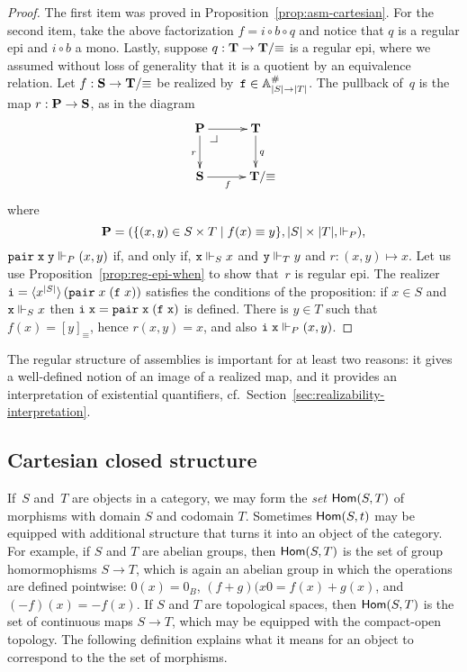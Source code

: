 \begin{proof}
  The first item was proved in Proposition~\ref{prop:asm-cartesian}.
  For the second item, take the above factorization $f = i \circ b
  \circ q$ and notice that $q$ is a regular epi and $i \circ b$ a
  mono. Lastly, suppose $q : \mathbf{T} \to \mathbf{T}/{\equiv}$ is a
  regular epi, where we assumed without loss of generality that it is
  a quotient by an equivalence relation. Let $f : \mathbf{S} \to
  \mathbf{T}/{\equiv}$ be realized by~$\mathtt{f} \in \mathbb{A}^{\#}_{|S| \to |T|}$.
  The pullback of~$q$ is the map $r : \mathbf{P} \to \mathbf{S}$, as in the
  diagram
  \begin{equation*}
    \xymatrix{
      {\asm{P}} \pbcorner
      \ar[r]
      \ar[d]_{r}
      &
      {\asm{T}}
      \ar[d]^{q}
      \\
      {\asm{S}}
      \ar[r]_{f}
      &
      **[r]{\asm{T}/{\equiv}}
      }
  \end{equation*}
  where
  \begin{equation*}
    \mathbf{P} = (\{(x,y) \in S \times T \mid f(x) \equiv y\},
               |S| \times |T|, {\Vdash_P}),
  \end{equation*}
  $\mathtt{pair}\;\mathtt{x}\;\mathtt{y} \Vdash_P (x,y)$ if, and only if, $\mathtt{x} \Vdash_S
  x$ and $\mathtt{y} \Vdash_T y$ and $r : (x,y) \mapsto x$. Let us use
  Proposition~\ref{prop:reg-epi-when} to show that~$r$ is regular epi.
  The realizer $\mathtt{i} =
  \langle x^{|S|} \rangle\,(\mathtt{pair}\;x\;(\mathtt{f}\;x))$ satisfies the
  conditions of the proposition: if $x \in S$ and $\mathtt{x} \Vdash_S x$ then
  $\mathtt{i}\;\mathtt{x} = \mathtt{pair}\;\mathtt{x}\;(\mathtt{f}\;\mathtt{x})$ is defined. There
  is $y \in T$ such that $f(x) = [y]_{\equiv}$, hence $r (x, y) = x$,
  and also $\mathtt{i}\;\mathtt{x} \Vdash_P (x, y)$.
\end{proof}

The regular structure of assemblies is important for at least two
reasons: it gives a well-defined notion of an image of a realized map,
and it provides an interpretation of existential quantifiers, cf.\
Section~\ref{sec:realizability-interpretation}.


\subsection{Cartesian closed structure}
\label{sec:ccc}


If~$S$ and~$T$ are objects in a category, we may form the \emph{set}
$\mathsf{Hom}(S, T)$ of morphisms with domain $S$ and codomain $T$. Sometimes
$\mathsf{Hom}(S, t)$ may be equipped with additional structure that turns it
into an object of the category. For example, if $S$ and $T$ are
abelian groups, then $\mathsf{Hom}(S,T)$ is the set of group homormophisms $S
\to T$, which is again an abelian group in which the operations are
defined pointwise: $0(x) = 0_B$, $(f + g)(x0 = f(x) + g(x)$, and
$(-f)(x) = -f(x)$. If $S$ and $T$ are topological spaces, then
$\mathsf{Hom}(S,T)$ is the set of continuous maps $S \to T$, which may be
equipped with the compact-open topology. The following definition
explains what it means for an object to correspond to the the set of
morphisms.

